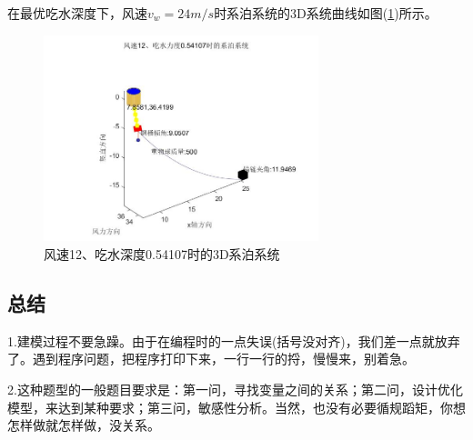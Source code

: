 \documentclass[UTF8]{ctexbook}
\theoremstyle{nonumberplain}
\begin{document}
            在最优吃水深度下，风速$v_w=24m/s$时系泊系统的3D系统曲线如图(\ref{风速12、吃水深度0.54107时的3D系泊系统})所示。
            \begin{figure}[H]
                \centering
                \includegraphics[width=8cm]{images/3D_v_wind_12_h_xitong.jpg}
                \caption{风速12、吃水深度0.54107时的3D系泊系统}
                \label{风速12、吃水深度0.54107时的3D系泊系统}
            \end{figure}

    \subsection{总结}
        \par
        1.建模过程不要急躁。由于在编程时的一点失误(括号没对齐)，我们差一点就放弃了。遇到程序问题，把程序打印下来，一行一行的捋，慢慢来，别着急。
        \par
        2.这种题型的一般题目要求是：第一问，寻找变量之间的关系；第二问，设计优化模型，来达到某种要求；第三问，敏感性分析。当然，也没有必要循规蹈矩，你想怎样做就怎样做，没关系。

\end{document}

